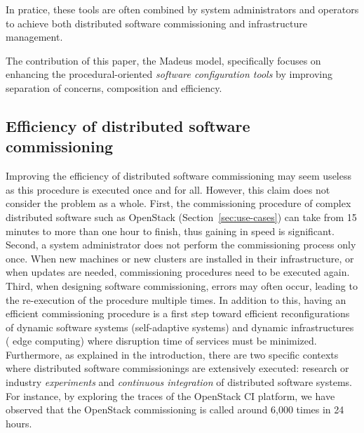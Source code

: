 In pratice, these tools are often combined by system administrators
and operators to achieve both distributed software commissioning and
infrastructure management.

\begin{tcolorbox}[enhanced,attach boxed title to top left={yshift=-3mm,yshifttext=-1mm},
  colback=black!5!white,colframe=black!30,colbacktitle=black!60,
  title=Scope,fonttitle=\bfseries,
  boxed title style={size=small,colframe=black!60,boxrule=0.2mm},
  boxrule=0.2mm]
  The contribution of this paper, \ie the Madeus model, specifically
  focuses on enhancing the procedural-oriented \emph{software
    configuration tools} by improving separation of concerns,
  composition and efficiency.
\end{tcolorbox}


\subsection{Efficiency of distributed software commissioning}

Improving the efficiency of distributed software commissioning may
seem useless as this procedure is executed once and for all. However, this claim
does not consider the problem as a whole.
%
First, the commissioning procedure of complex distributed software
such as OpenStack (Section~\ref{sec:use-cases}) can take from 15
minutes to more than one hour to finish, thus gaining in speed is
significant. Second, a system administrator does not perform the
commissioning process only once. When new machines or new clusters are
installed in their infrastructure, or when updates are needed,
commissioning procedures need to be executed again. Third, when
designing software commissioning, errors may often occur, leading to the
re-execution of the procedure multiple times.
In addition to this, having an efficient commissioning procedure is a
first step toward efficient reconfigurations of dynamic software
systems (\eg self-adaptive systems) and dynamic infrastructures (\eg
edge computing) where disruption time of services must be minimized.
Furthermore, as explained in the introduction, there are two
specific contexts where distributed software commissionings are
extensively executed: research or industry \emph{experiments} and
\emph{continuous integration} of distributed software systems. For
instance, by exploring the traces of the OpenStack CI platform, we have
observed that the OpenStack commissioning is called around 6,000 times
in 24 hours.

